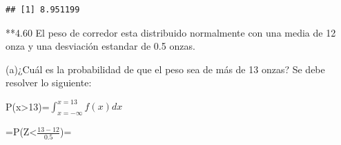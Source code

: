 \documentclass[
]{article}
\begin{document}
\begin{verbatim}
## [1] 8.951199
\end{verbatim}

**4.60 El peso de corredor esta distribuido normalmente con una media de
12 onza y una desviación estandar de 0.5 onzas.

(a)¿Cuál es la probabilidad de que el peso sea de más de 13 onzas? Se
debe resolver lo siguiente:

P(x\textgreater13)=\(\int_{x=-\infty}^{x=13} f(x) dx\)

=P(Z\textless{}\(\frac{13-12}{0.5}\))=
\end{document}
